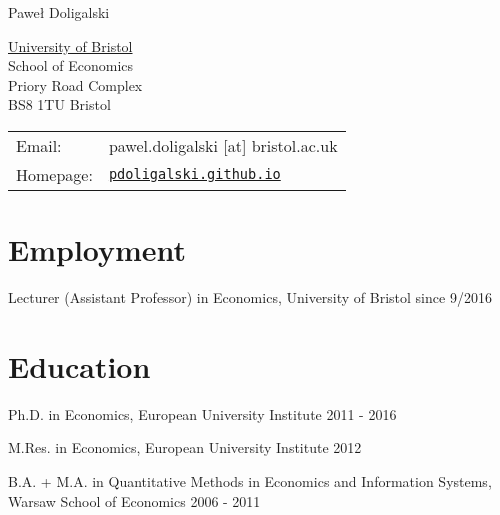 \documentclass[letterpaper]{article}
\def\name{Pawe\l{} Doligalski}
\renewenvironment{itemize}{
  \begin{list}{}{
    \setlength{\leftmargin}{1.5em}
  }
}{
  \end{list}
}
\begin{document}
{\huge \name}


\vspace{0.25in}

\begin{minipage}{0.45\linewidth}
  \href{http://www.unc.edu/}{University of Bristol} \\
  School of Economics \\
  Priory Road Complex \\
  BS8 1TU Bristol
\end{minipage}
\begin{minipage}{0.45\linewidth}
  \begin{tabular}{ll}
    Email: & pawel.doligalski [at] bristol.ac.uk \\
    Homepage: & \href{http://pdoligalski.github.io}{\tt pdoligalski.github.io} \\
  \end{tabular}
\end{minipage}

\section*{Employment}

\begin{itemize}
\item Lecturer (Assistant Professor) in Economics, University of Bristol \hfill since 9/2016
\end{itemize}


\section*{Education}

\begin{itemize}
  \item Ph.D. in Economics, European University Institute \hfill 2011 - 2016

  \item M.Res. in Economics, European University Institute \hfill 2012

  \item{B.A. + M.A. in Quantitative Methods in Economics and Information Systems,\\
   \indent \hspace{8cm} Warsaw School of Economics \hfill 2006 - 2011}


\end{itemize}
\end{document}
